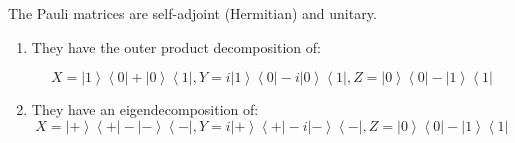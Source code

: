 \documentclass{article}
\newcommand{\ket}[1]{\ensuremath{\left|#1\right\rangle}}
\newcommand{\bra}[1]{\ensuremath{\left\langle#1\right|}}
\begin{document}
  \begin{lemma}
    \label{thm:decomposition-of-pauli-matrices}
    The Pauli matrices are self-adjoint (Hermitian) and unitary. 
  
    \begin{enumerate}
      \item They have the outer product decomposition of: 

        \begin{equation}
          X = \ket{1} \bra{0} + \ket{0} \bra{1}, Y = i \ket{1} \bra{0} - i \ket{0} \bra{1}, Z = \ket{0} \bra{0} - \ket{1} \bra{1}
        \end{equation}

      \item They have an eigendecomposition of: 
        \begin{equation} 
          X = \ket{+} \bra{+} - \ket{-} \bra{-}, Y = i \ket{+} \bra{+} - i \ket{-} \bra{-}, Z = \ket{0} \bra{0} - \ket{1} \bra{1}   
        \end{equation}
    \end{enumerate}
  \end{lemma}
\end{document}
